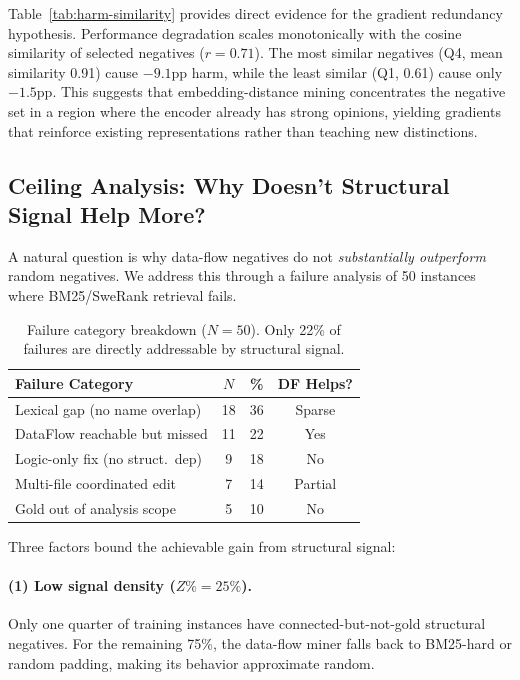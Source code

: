 \documentclass[11pt,a4paper]{article}
\begin{document}
Table~\ref{tab:harm-similarity} provides direct evidence for the gradient redundancy hypothesis.
Performance degradation scales monotonically with the cosine similarity of selected negatives ($r{=}0.71$).
The most similar negatives (Q4, mean similarity 0.91) cause $-9.1$pp harm, while the least similar (Q1, 0.61) cause only $-1.5$pp.
This suggests that embedding-distance mining concentrates the negative set in a region where the encoder already has strong opinions, yielding gradients that reinforce existing representations rather than teaching new distinctions.

\subsection{Ceiling Analysis: Why Doesn't Structural Signal Help More?}
\label{sec:ceiling}

A natural question is why data-flow negatives do not \emph{substantially outperform} random negatives.
We address this through a failure analysis of 50 instances where BM25/SweRank retrieval fails.

\begin{table}[t]
\centering
\small
\begin{tabular}{lccc}
\toprule
\textbf{Failure Category} & \textbf{$N$} & \textbf{\%} & \textbf{DF Helps?} \\
\midrule
Lexical gap (no name overlap) & 18 & 36 & Sparse \\
DataFlow reachable but missed & 11 & 22 & Yes \\
Logic-only fix (no struct.\ dep) & 9 & 18 & No \\
Multi-file coordinated edit & 7 & 14 & Partial \\
Gold out of analysis scope & 5 & 10 & No \\
\bottomrule
\end{tabular}
\caption{Failure category breakdown ($N{=}50$). Only 22\% of failures are directly addressable by structural signal.}
\label{tab:failure}
\end{table}

Three factors bound the achievable gain from structural signal:

\paragraph{(1) Low signal density ($Z\%{=}25\%$).}
Only one quarter of training instances have connected-but-not-gold structural negatives.
For the remaining 75\%, the data-flow miner falls back to BM25-hard or random padding, making its behavior approximate random.
\end{document}
